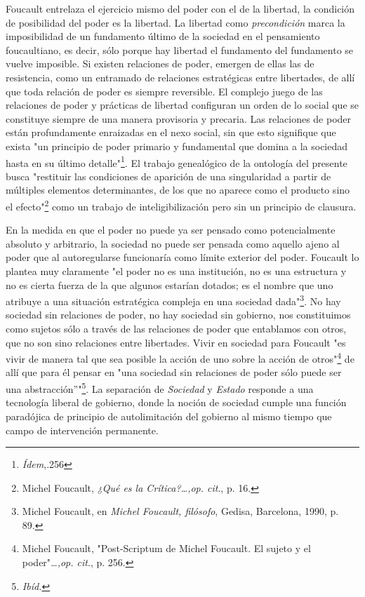 \documentclass{book}
\begin{document}
Foucault entrelaza el ejercicio mismo del poder con el de la libertad,
la condición de posibilidad del poder es la libertad. La libertad como
\emph{precondición} marca la imposibilidad de un fundamento último de la
sociedad en el pensamiento foucaultiano, es decir, sólo porque hay
libertad el fundamento del fundamento se vuelve imposible. Si existen
relaciones de poder, emergen de ellas las de resistencia, como un
entramado de relaciones estratégicas entre libertades, de allí que toda
relación de poder es siempre reversible. El complejo juego de las
relaciones de poder y prácticas de libertad configuran un orden de lo
social que se constituye siempre de una manera provisoria y precaria.
Las relaciones de poder están profundamente enraizadas en el nexo
social, sin que esto signifique que exista "un principio de poder
primario y fundamental que domina a la sociedad hasta en su último
detalle"\footnote{\emph{Ídem},.256}. El trabajo genealógico de la
ontología del presente busca "restituir las condiciones de aparición de
una singularidad a partir de múltiples elementos determinantes, de los
que no aparece como el producto sino el efecto"\footnote{Michel
  Foucault, \emph{¿Qué es la Crítica?\ldots,op. cit}., p. 16.} como un
trabajo de inteligibilización pero sin un principio de clausura.

En la medida en que el poder no puede ya ser pensado como potencialmente
absoluto y arbitrario, la sociedad no puede ser pensada como aquello
ajeno al poder que al autoregularse funcionaría como límite exterior del
poder. Foucault lo plantea muy claramente "el poder no es una
institución, no es una estructura y no es cierta fuerza de la que
algunos estarían dotados; es el nombre que uno atribuye a una situación
estratégica compleja en una sociedad dada"\footnote{Michel Foucault, en
  \emph{Michel Foucault, filósofo}, Gedisa, Barcelona, 1990, p. 89.}. No
hay sociedad sin relaciones de poder, no hay sociedad sin gobierno, nos
constituimos como sujetos sólo a través de las relaciones de poder que
entablamos con otros, que no son sino relaciones entre libertades. Vivir
en sociedad para Foucault "es vivir de manera tal que sea posible la
acción de uno sobre la acción de otros"\footnote{Michel Foucault,
  "Post-Scriptum de Michel Foucault. El sujeto y el
  poder"\emph{\ldots,op. cit}., p. 256.} de allí que para él pensar en
"una sociedad sin relaciones de poder sólo puede ser una
abstracción''"\footnote{\emph{Ibíd.}}. La separación de \emph{Sociedad}
y \emph{Estado} responde a una tecnología liberal de gobierno, donde la
noción de sociedad cumple una función paradójica de principio de
autolimitación del gobierno al mismo tiempo que campo de intervención
permanente.
\end{document}

